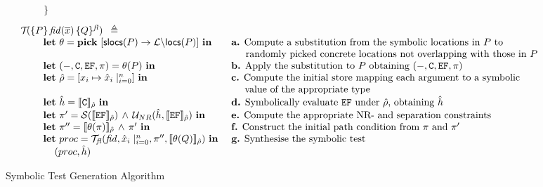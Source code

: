 \begin{figure*}
\begin{center}
$$\begin{array}{ll}
         \ \ \ \ \ \ \ \} \\[8pt]
%         
\testify{}(\specsig{P}{\fid(\jvec{x})}{Q}{\flag}) \ \semeq & \\      
    \dspc \dspc  \mathbf{let} \ \subst = \mathbf{pick} \ \functionset{\aslocs(P)}{\locs \backslash \eflocs(P)} \ \mathbf{in} 
           & \text{  {\bf a.}  Compute a substitution from the symbolic locations in $P$ to} \\ 
           & \text{ $\phantom{a.}\ $ randomly picked concrete locations not overlapping with those in $P$}  \\
    \dspc \dspc  \mathbf{let} \ (-, \cells, \efs, \pc) = \subst(P) \ \mathbf{in}  
            & \text{  {\bf b.}  Apply the substitution to $P$ obtaining $(-, \cells, \efs, \pc)$}  \\
    \dspc \dspc  \mathbf{let} \ \sstore = [ \jvar_i \mapsto \svar_i \mid_{i=0}^n] \ \mathbf{in} 
            & \text{  {\bf c.} Compute the initial store mapping each argument to a symbolic}  \\
            & \text{ $\phantom{c.} \ $  value of the appropriate type}  \\
    \dspc \dspc  \mathbf{let} \ \sheap = \symbeval{\cells}{\sstore} \ \mathbf{in} 
           & \text{  {\bf d.}  Symbolically evaluate $\efs$ under $\sstore$, obtaining $\sheap$}  \\
    \dspc \dspc  \mathbf{let} \ \pc' = \sanity{\symbeval{\efs}{\sstore}} \, \wedge \,  \unificationef{\sheap}{\symbeval{\efs}{\sstore}}  \ \mathbf{in} 
           & \text{  {\bf e.}  Compute the appropriate NR- and separation constraints}  \\
      \dspc \dspc  \mathbf{let} \ \pc'' = \symbeval{\subst(\pc)}{\sstore} \, \wedge \, \pc'  \ \mathbf{in} 
          & \text{  {\bf f.} Construct the initial path condition from $\pc$ and $\pc'$}  \\
       \dspc \dspc  \mathbf{let} \ \proc = \testify{\flag}(\fid, \svar_i\mid_{i=0}^n, \pc'', \symbeval{\subst(Q)}{\sstore})  \ \mathbf{in} 
          & \text{  {\bf g.} Synthesise the symbolic test} \\
      \dspc \dspc \dspc (\proc, \sheap) 
\end{array}
$$
\vspace*{-0.2cm}
\caption{Symbolic Test Generation Algorithm~\label{fig:test:generation}}
\vspace*{-0.2cm}
\end{center}
\end{figure*}


